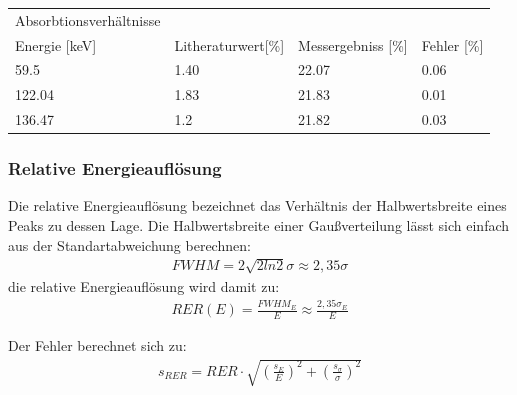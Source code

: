 \documentclass[12pt]{article}
\begin{document}
\begin{center}
\begin{tabular}{|l|lll|}
\hline
Absorbtionsverhältnisse \\
Energie [keV] & Litheraturwert[\%] & Messergebniss [\%] & Fehler [\%] \\
\hline
59.5 & 1.40 & 22.07 & 0.06 \\
122.04 & 1.83 & 21.83 & 0.01 \\
136.47 & 1.2 & 21.82 & 0.03 \\
\hline
\end{tabular}
\end{center}



\subsubsection{Relative Energieauflösung}
Die relative Energieauflösung bezeichnet das Verhältnis der Halbwertsbreite
eines Peaks zu dessen Lage. Die Halbwertsbreite einer Gaußverteilung lässt sich einfach aus der Standartabweichung berechnen:
\begin{align*}
 FWHM = 2\sqrt{2 ln 2} \sigma \approx 2,35\sigma
\end{align*}
die relative Energieauflösung wird damit zu:
\begin{align*}
 RER(E) = \frac{FWHM_E}{E} \approx \frac{2,35\sigma_E}{E}
\end{align*}

Der Fehler berechnet sich zu:
\begin{align*}
 s_{RER} = RER \cdot \sqrt{\left(\frac{s_E}{E}\right)^2 + \left(\frac{s_{\sigma}}{\sigma}\right)^2}
\end{align*}
\end{document}
